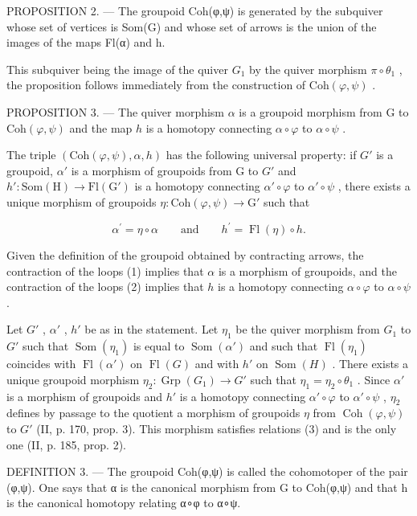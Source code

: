 PROPOSITION 2. --- The groupoid Coh(φ,ψ) is generated by the subquiver whose set of vertices is Som(G) and whose set of arrows is the union of the images of the maps Fl(α) and h.

This subquiver being the image of the quiver \(G_{1}\) by the quiver morphism \(\pi \circ \theta_{1}\) , the proposition follows immediately from the construction of \(\mathrm{Coh}(\varphi, \psi)\) .

PROPOSITION 3. --- The quiver morphism \(\alpha\) is a groupoid morphism from G to \(\mathrm{Coh}(\varphi, \psi)\) and the map \(h\) is a homotopy connecting \(\alpha \circ \varphi\) to \(\alpha \circ \psi\) .

The triple \((\mathrm{Coh}(\varphi,\psi),\alpha,h)\) has the following universal property: if \(G'\) is a groupoid, \(\alpha'\) is a morphism of groupoids from G to \(G'\) and \(h'\colon\mathrm{Som}(\mathrm{H})\to\mathrm{Fl}(\mathrm{G}')\) is a homotopy connecting \(\alpha'\circ\varphi\) to \(\alpha'\circ\psi\) , there exists a unique morphism of groupoids \(\eta\colon\mathrm{Coh}(\varphi,\psi)\to\mathrm{G}'\) such that

\[
\alpha^ {\prime} = \eta \circ \alpha \qquad\text{and}\qquad h ^ {\prime} = \operatorname{Fl} (\eta) \circ h.\tag{3}
\]

Given the definition of the groupoid obtained by contracting arrows, the contraction of the loops (1) implies that \(\alpha\) is a morphism of groupoids, and the contraction of the loops (2) implies that \(h\) is a homotopy connecting \(\alpha \circ \varphi\) to \(\alpha \circ \psi\) .

Let \(G'\) , \(\alpha'\) , \(h'\) be as in the statement. Let \(\eta_{1}\) be the quiver morphism from \(G_{1}\) to \(G'\) such that \(\operatorname{Som}(\eta_{1})\) is equal to \(\operatorname{Som}(\alpha')\) and such that \(\operatorname{Fl}(\eta_{1})\) coincides with \(\operatorname{Fl}(\alpha')\) on \(\operatorname{Fl}(G)\) and with \(h'\) on \(\operatorname{Som}(H)\) . There exists a unique groupoid morphism \(\eta_{2}: \operatorname{Grp}(G_{1}) \to G'\) such that \(\eta_{1} = \eta_{2} \circ \theta_{1}\) . Since \(\alpha'\) is a morphism of groupoids and \(h'\) is a homotopy connecting \(\alpha' \circ \varphi\) to \(\alpha' \circ \psi\) , \(\eta_{2}\) defines by passage to the quotient a morphism of groupoids \(\eta\) from \(\operatorname{Coh}(\varphi, \psi)\) to \(G'\) (II, p. 170, prop. 3). This morphism satisfies relations (3) and is the only one (II, p. 185, prop. 2).

DEFINITION 3. --- The groupoid Coh(φ,ψ) is called the cohomotoper of the pair (φ,ψ). One says that α is the canonical morphism from G to Coh(φ,ψ) and that h is the canonical homotopy relating α∘φ to α∘ψ.

